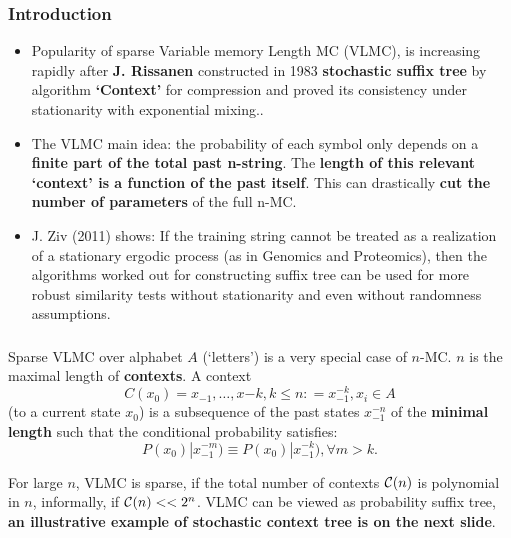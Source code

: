\documentclass{beamer}
\begin{document}
\begin{frame}
\frametitle{Introduction} %

\begin{itemize}
\item Popularity of  sparse Variable memory Length MC (VLMC), is
increasing rapidly after {\bf J. Rissanen}  constructed  in 1983   {\bf stochastic suffix tree} by algorithm {\bf `Context'}  for compression and proved its consistency under stationarity with exponential mixing.. 

 \item  The  VLMC main idea: the probability
 of each symbol only depends on a {\bf finite part of the total past n-string}. The {\bf length
of this relevant `context' is a function of the past itself}. This can drastically {\bf cut the number of parameters} of the full n-MC.

\item
J. Ziv (2011)  shows: If the training string  cannot be treated as a realization of a stationary ergodic process (as in Genomics and Proteomics), then  the algorithms worked out for constructing   suffix tree can be used for more robust similarity tests without stationarity and even without randomness assumptions.

\end{itemize}

\tableofcontents %
\end{frame}
\begin{frame}
\frametitle{}
Sparse VLMC over alphabet  $A$  (`letters') is a very special case of $n$-MC. 
\noindent $n$ is the maximal length of {\bf contexts}. A context
 \begin{equation}
 C(x_0) = x_{-1},\dots,x{{-k}}, k\le n: = x_{-1}^{-k}, x_i\in A
 \end{equation}
  (to a current state $x_0$) is a subsequence of the past states $x_{-1}^{-n}$ of the {\bf minimal length} such that the conditional probability satisfies:
  \begin{equation}
  P(x_0)|x_{-1}^{-m})\equiv P(x_0)|x_{-1}^{-k}) ,  \forall m>k.
  \end{equation}

For large $n$, VLMC is sparse, if the total number of contexts ${\cal C}(n)$ is polynomial in $n$, informally, if
  ${\cal C}(n)<< 2^n$.
  VLMC can be viewed as probability suffix tree, 
  {\bf an illustrative example of stochastic context tree is on the next slide}.

\end{frame}
\end{document}
